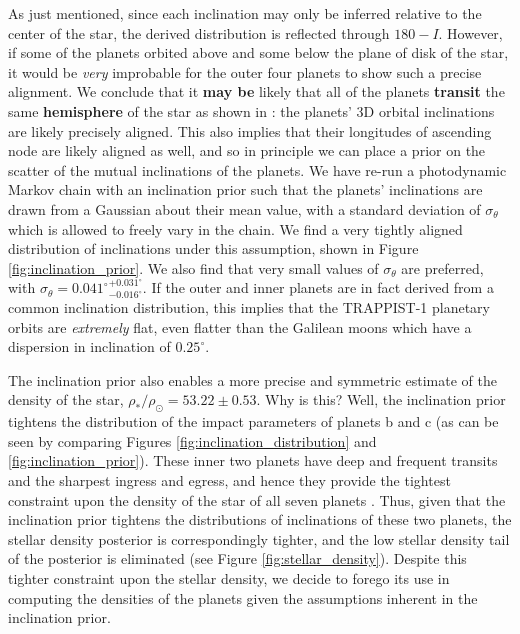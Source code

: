 \documentclass[twocolumn]{aastex63}
\begin{document}
As just mentioned, since each inclination may only be inferred relative to the center of
the star, the derived distribution is reflected through $180-I$.
However, if some of the planets orbited above and some below the plane of disk
of the star, it would be {\it very} improbable for the outer four planets to show
such a precise alignment.  We conclude that it \textbf{may be} likely that all of the planets \textbf{transit}
the same \textbf{hemisphere} of the star as shown in \citet{Luger2017b}: the planets'
3D orbital inclinations are likely precisely aligned.   This also implies
that their longitudes of ascending node are likely aligned as well, and
so in principle we can place a prior on the scatter of the mutual inclinations
of the planets.  We have re-run a photodynamic Markov chain with an inclination prior such
that the planets' inclinations are drawn from a Gaussian about their mean value,
with a standard deviation of $\sigma_\theta$ which is allowed to freely vary in
the chain.  We find a very tightly aligned distribution of inclinations under
this assumption, shown in Figure \ref{fig:inclination_prior}.  We also find that
very small values of $\sigma_\theta$ are preferred, with $ \sigma_\theta = {0.041^\circ}_{-0.016^\circ}^{+0.031^\circ} $.
If the outer and inner planets are in fact derived from a common inclination
distribution, this implies that the TRAPPIST-1 planetary orbits are {\it extremely}
flat, even flatter than the Galilean moons which have a dispersion in inclination of
$0.25^\circ$.

The inclination prior also enables a more precise and symmetric
estimate of the density of the star, $\rho_*/\rho_\odot {=} 53.22{\pm} 0.53$.  Why is this?  Well, the
inclination prior tightens the distribution of the impact parameters of planets b
and c (as can be seen by comparing Figures \ref{fig:inclination_distribution} and
\ref{fig:inclination_prior}).  These inner two planets have deep and frequent
transits and the sharpest ingress and egress, and hence they provide the tightest
constraint upon the density of the star of all seven planets \citep{Ducrot2020}.
Thus, given that the inclination prior tightens the distributions of inclinations
of these two planets, the stellar density posterior is correspondingly tighter, and
the low stellar density tail of the posterior is eliminated (see Figure \ref{fig:stellar_density}).  Despite this tighter
constraint upon the stellar density, we decide to forego its use in computing the
densities of the planets given the assumptions inherent in the inclination prior.
\end{document}
